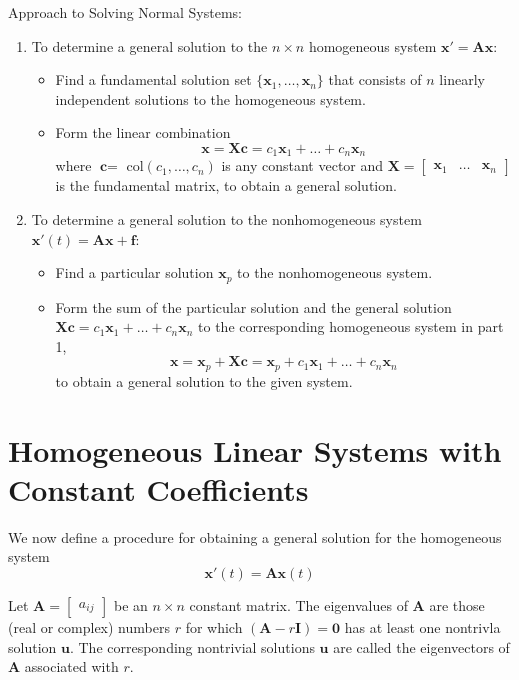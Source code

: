 \documentclass[../diffeq.tex]{subfiles}
\begin{document}
Approach to Solving Normal Systems:
\begin{enumerate}
    \item To determine a general solution to the $n\times n$ homogeneous system $\textbf{x}'=\textbf{A}\textbf{x}$:
    \begin{itemize}
        \item Find a fundamental solution set $\{\textbf{x}_1,\dots,\textbf{x}_n\}$ that consists of $n$ linearly independent solutions to the homogeneous system.
        \item Form the linear combination 
        \[ \textbf{x}=\textbf{X}\textbf{c}=c_1\textbf{x}_1+\dots + c_n\textbf{x}_n \]
        where $\textbf{c}=$ col$(c_1,\dots,c_n)$ is any constant vector and $\textbf{X}=\begin{bmatrix}
            \textbf{x}_1 & \dots & \textbf{x}_n
        \end{bmatrix}$ is the fundamental matrix, to obtain a general solution.
    \end{itemize}
    \item To determine a general solution to the nonhomogeneous system $\textbf{x}'(t)=\textbf{Ax}+\textbf{f}$:
    \begin{itemize}
        \item Find a particular solution $\textbf{x}_p$ to the nonhomogeneous system.
        \item Form the sum of the particular solution and the general solution $\textbf{Xc}=c_1\textbf{x}_1+\dots + c_n\textbf{x}_n$ to the corresponding homogeneous system in part 1, 
        \[\textbf{x}=\textbf{x}_p+\textbf{Xc}=\textbf{x}_p+c_1\textbf{x}_1+\dots + c_n\textbf{x}_n\]
        to obtain a general solution to the given system.
    \end{itemize}
\end{enumerate}

\section{Homogeneous Linear Systems with Constant Coefficients}
We now define a procedure for obtaining a general solution for the homogeneous system 
\[ \textbf{x}'(t)=\textbf{Ax}(t)\]
\begin{definition}
    Let $\textbf{A}=\begin{bmatrix}
        a_{ij}
    \end{bmatrix}$ be an $n\times n$ constant matrix. The eigenvalues of $\textbf{A}$ are those (real or complex) numbers $r$ for which $(\textbf{A}-r\textbf{I})=\textbf{0}$ has at least one nontrivla solution $\textbf{u}$. The corresponding 
    nontrivial solutions $\textbf{u}$ are called the eigenvectors of $\textbf{A}$ associated with $r$.
\end{definition}
\end{document}
